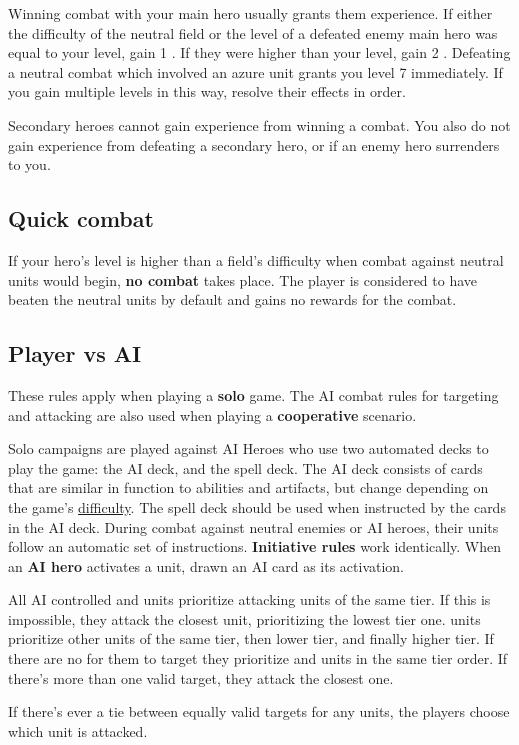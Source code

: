 Winning combat with your main hero usually grants them experience.
If either the difficulty of the neutral field or the level of a defeated enemy main hero was equal to your level, gain 1 .
If they were higher than your level, gain 2 .
Defeating a neutral combat which involved an azure  unit grants you level 7 immediately.
If you gain multiple levels in this way, resolve their effects in order.\par
Secondary heroes cannot gain experience from winning a combat.
You also do not gain experience from defeating a secondary hero, or if an enemy hero surrenders to you.
\subsection*{\hypertarget{Quick}{Quick combat}}
If your hero’s level is higher than a field’s difficulty when combat against neutral units would begin, \textbf{no combat} takes place.
The player is considered to have beaten the neutral units by default and gains no rewards for the combat.

\subsection*{\hypertarget{AIrules}{Player vs AI}}
These rules apply when playing a \textbf{solo} game.
The AI combat rules for targeting and attacking are also used when playing a \textbf{cooperative} scenario.\par
Solo campaigns are played against AI Heroes who use two automated decks to play the game: the AI deck, and the spell deck.
The AI deck consists of cards that are similar in function to abilities and artifacts, but change depending on the game's \hyperlink{Difficulty}{difficulty}.
The spell deck should be used when instructed by the cards in the AI deck.
During combat against neutral enemies or AI heroes, their units follow an automatic set of instructions.
\textbf{Initiative rules} work identically.
When an \textbf{AI hero} activates a unit, drawn an AI card as its activation.\par
All AI controlled  and  units prioritize attacking units of the same tier.
If this is impossible, they attack the closest unit, prioritizing the lowest tier one.
 units prioritize other  units of the same tier, then lower tier, and finally higher tier.
If there are no  for them to target they prioritize  and  units in the same tier order.
If there's more than one valid target, they attack the closest one.\par
If there's ever a tie between equally valid targets for any units, the players choose which unit is attacked.

